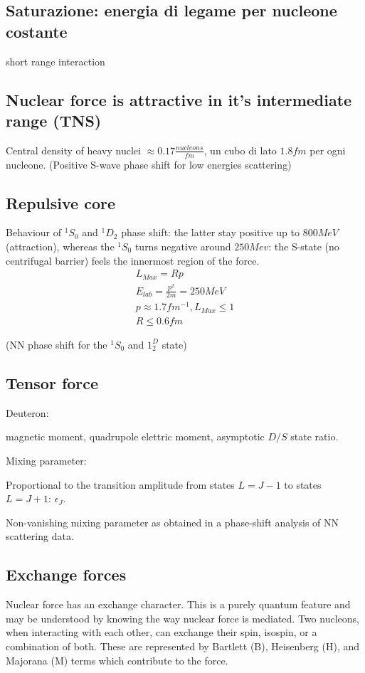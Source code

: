 \documentclass[main.tex]{subfiles}
\begin{document}
\subsection{Saturazione: energia di legame per nucleone costante}
short range interaction
\subsection{Nuclear force is attractive in it's intermediate range (TNS)}
Central density of heavy nuclei $\approx0.17 \frac{nucleons}{fm}$, un cubo di lato $1.8 fm$ per ogni nucleone. (Positive S-wave phase shift for low energies scattering)

\subsection{Repulsive core}

Behaviour of $^1S_0$ and $^1D_2$ phase shift: the latter stay positive up to $800 MeV$ (attraction), whereas the $^1S_0$ turns negative around $250 Mev$: the S-state (no centrifugal barrier) feels the innermost region of the force.
\begin{align*}
L_{Max}=Rp\\
E_{lab}=\frac{p^2}{2m}=250 MeV\\
p\approx1.7 fm^{-1}, L_{Max}\leq1\\
R\leq0.6 fm
\end{align*}

(NN phase shift for the $^1S_0$ and $1^D_2$ state)

\subsection{Tensor force}
Deuteron:

magnetic moment, quadrupole elettric moment, asymptotic $D/S$ state ratio.

Mixing parameter:

Proportional to the transition amplitude from states $L=J-1$ to states $L=J+1$: $\epsilon_J$.

Non-vanishing mixing parameter as obtained in a phase-shift  analysis of NN scattering data.

\subsection{Exchange forces}
 Nuclear force has an exchange character. This is a purely quantum feature and may be understood by knowing the way nuclear force is mediated. Two nucleons, when interacting with each other, can exchange their spin, isospin, or a combination of both. These are represented by Bartlett (B), Heisenberg (H), and Majorana (M) terms which contribute to the force.
\end{document}
